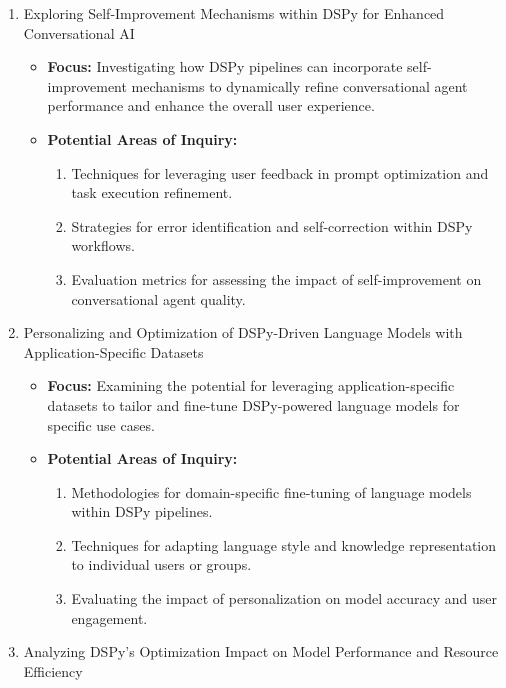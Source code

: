 \begin{enumerate}
\item Exploring Self-Improvement Mechanisms within DSPy for Enhanced Conversational AI
\begin{itemize}
    \item \textbf{Focus:} Investigating how DSPy pipelines can incorporate self-improvement mechanisms to dynamically refine conversational agent performance and enhance the overall user experience. 

    \item \textbf{Potential Areas of Inquiry:}
        \begin{enumerate}
            \item Techniques for leveraging user feedback in prompt optimization and task execution refinement.
            \item Strategies for error identification and self-correction within DSPy workflows.
            \item Evaluation metrics for assessing the impact of self-improvement on conversational agent quality.
        \end{enumerate}
\end{itemize}

\item Personalizing and Optimization of DSPy-Driven Language Models with Application-Specific Datasets

\begin{itemize}
    \item \textbf{Focus:} Examining the potential for leveraging application-specific datasets to tailor and fine-tune DSPy-powered language models for specific use cases.

    \item \textbf{Potential Areas of Inquiry:}
        \begin{enumerate}
            \item Methodologies for domain-specific fine-tuning of language models within DSPy pipelines.
            \item Techniques for adapting language style and knowledge representation to individual users or groups.
            \item Evaluating the impact of personalization on model accuracy and user engagement.
        \end{enumerate}
\end{itemize}

\item Analyzing DSPy's Optimization Impact on Model Performance and Resource Efficiency


\end{enumerate}
